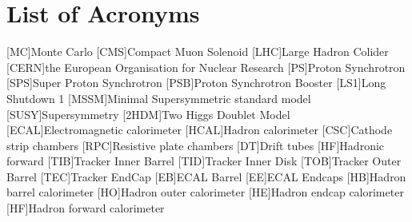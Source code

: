 




\chapter*{List of Acronyms}
\begin{acronym}[CERN]
[MC]{Monte Carlo}
[CMS]{Compact Muon Solenoid}
[LHC]{Large Hadron Colider}
[CERN]{the European Organisation for Nuclear Research }
[PS]{Proton Synchrotron}
[SPS]{Super Proton Synchrotron}
[PSB]{Proton Synchrotron Booster}
[LS1]{Long Shutdown 1}
[MSSM]{Minimal Supersymmetric standard model}
[SUSY]{Supersymmetry}
[2HDM]{Two Higgs Doublet Model}
[ECAL]{Electromagnetic calorimeter}
[HCAL]{Hadron calorimeter}
[CSC]{Cathode strip chambers}
[RPC]{Resistive plate chambers}
[DT]{Drift tubes}
[HF]{Hadronic forward}
[TIB]{Tracker Inner Barrel}
[TID]{Tracker Inner Disk}
[TOB]{Tracker Outer Barrel}
[TEC]{Tracker EndCap}
[EB]{ECAL Barrel}
[EE]{ECAL Endcaps}
[HB]{Hadron barrel calorimeter}
[HO]{Hadron outer calorimeter}
[HE]{Hadron endcap calorimeter}
[HF]{Hadron forward calorimeter}
\end{acronym}


